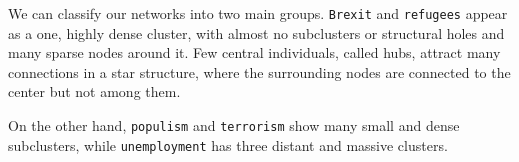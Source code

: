 We can classify our networks into two main groups. \texttt{Brexit} and \texttt{refugees} appear as a one, highly dense cluster, with almost no subclusters or structural holes and many sparse nodes around it. Few central individuals, called hubs, attract many connections in a star structure, where the surrounding nodes are connected to the center but not among them.

On the other hand, \texttt{populism} and \texttt{terrorism} show many small and dense subclusters, while \texttt{unemployment} has three distant and massive clusters.
